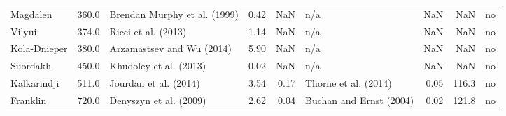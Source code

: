 \begin{tabular}{lrlrrlrrl}
            Magdalen &  360.0 &  Brendan Murphy et al. (1999) &                0.42 &                NaN &                                            n/a &               NaN &        NaN &       no \\
              Vilyui &  374.0 &           Ricci et al. (2013) &                1.14 &                NaN &                                            n/a &               NaN &        NaN &       no \\
        Kola-Dnieper &  380.0 &     Arzamastsev and Wu (2014) &                5.90 &                NaN &                                            n/a &               NaN &        NaN &       no \\
            Suordakh &  450.0 &        Khudoley et al. (2013) &                0.02 &                NaN &                                            n/a &               NaN &        NaN &       no \\
         Kalkarindji &  511.0 &         Jourdan et al. (2014) &                3.54 &               0.17 &                           Thorne et al. (2014) &              0.05 &      116.3 &       no \\
            Franklin &  720.0 &        Denyszyn et al. (2009) &                2.62 &               0.04 &                        Buchan and Ernst (2004) &              0.02 &      121.8 &       no \\
\bottomrule
\end{tabular}
